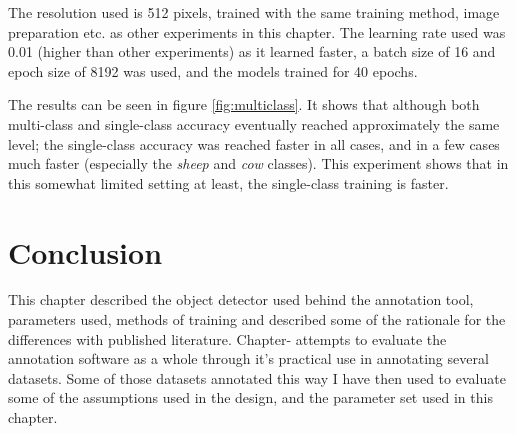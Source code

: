 The resolution used is 512 pixels, trained with the same training method, image preparation etc. as other experiments in this chapter. The learning rate used was 0.01 (higher than other experiments) as it learned faster, a batch size of 16 and epoch size of 8192 was used, and the models trained for 40 epochs. 

The results can be seen in figure \ref{fig:multiclass}. It shows that although both multi-class and single-class accuracy eventually reached approximately the same level; the single-class accuracy was reached faster in all cases, and in a few cases much faster (especially the \emph{sheep} and \emph{cow} classes). This experiment shows that in this somewhat limited setting at least, the single-class training is faster.



\section {Conclusion}

This chapter described the object detector used behind the annotation tool, parameters used, methods of training and described some of the rationale for the differences with published literature. Chapter-\label{chap:annotation} attempts to evaluate the annotation software as a whole through it's practical use in annotating several datasets. Some of those datasets annotated this way I have then used to evaluate some of the assumptions used in the design, and the parameter set used in this chapter. 


